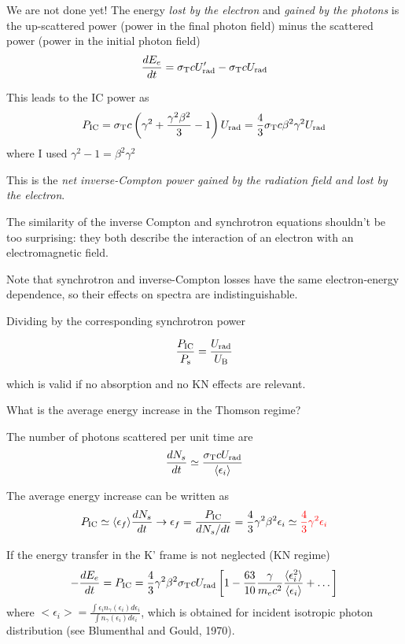 We are not done yet! The energy \emph{lost by the electron} and \emph{gained by the photons} is the up-scattered power (power in the final photon field) minus the scattered power (power in the initial photon field)
%
\begin{equation*}
\frac{dE_e}{dt} 
= \sigma_{\rm T} c U'_{\rm rad} - \sigma_{\rm T} c U_{\rm rad}
\end{equation*}

This leads to the IC power as
%
\begin{equation*}
P_{\rm IC} = \sigma_{\rm T} c \left(\gamma^2 +\frac{\gamma^2 \beta^2}{3} -1 \right) U_{\rm rad} = \frac{4}{3}
\sigma_{\rm T} c \beta^2 \gamma^2 U_{\rm rad}
\end{equation*}
%
where I used $\gamma^2 - 1 = \beta^2 \gamma^2$

This is the \emph{net inverse-Compton power gained by the radiation field and lost by the electron}. 

The similarity of the inverse Compton and synchrotron equations shouldn’t be too surprising: they both describe the interaction of an electron with an electromagnetic field.

Note that synchrotron and inverse-Compton losses have the same electron-energy dependence, so their effects on  spectra are indistinguishable.

Dividing by the corresponding synchrotron power 
%
\begin{remark}
\[
\frac{P_{\rm IC}}{P_{\rm s}} = \frac{U_{\rm rad}}{U_{\rm B}}    
\]
\end{remark}
%
which is valid if no absorption and no KN effects are relevant.

What is the average energy increase in the Thomson regime? 

 The number of photons scattered per unit time are
%
\begin{equation*}
\frac{dN_s}{dt} \simeq \frac{\sigma_{\rm T} c U_{\rm rad}}{\langle \epsilon_i \rangle}
\end{equation*}

The average energy increase can be written as
%
\begin{equation*}
P_{\rm IC} \simeq \langle \epsilon_f \rangle \frac{dN_s}{dt} \rightarrow \epsilon_f = \frac{P_{\rm IC}}{dN_s/dt} = \frac{4}{3} \gamma^2 \beta^2 \epsilon_i \simeq {\color{red}\frac{4}{3} \gamma^2 \epsilon_i}
\end{equation*}

If the energy transfer in the K' frame is not neglected (KN regime)
%
\begin{equation*}
- \frac{dE_e}{dt} = P_{\rm IC} = \frac{4}{3} \gamma^2 \beta^2 \sigma_{\rm T} c U_{\rm rad} \left[1 - \frac{63}{10} \frac{\gamma}{m_e c^2} \frac{\langle \epsilon_i^2 \rangle}{\langle \epsilon_i \rangle} + \dots \right]
\end{equation*}
%
where $<\epsilon_i> = \frac{\int \epsilon_i n_\gamma(\epsilon_i) d\epsilon_i}{\int n_\gamma(\epsilon_i) d\epsilon_i}$, which is obtained for incident isotropic photon distribution (see Blumenthal and Gould, 1970).

